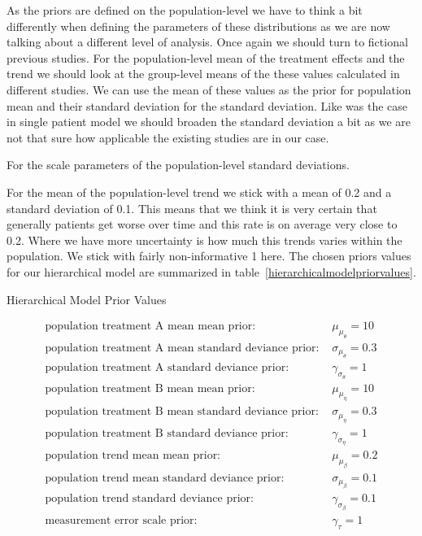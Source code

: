 \documentclass[12pt,a4paper,leqno]{report}
\theoremstyle{plain}
\theoremstyle{definition}
\theoremstyle{remark}
\begin{document}

As the priors are defined on the population-level we have to think a bit differently when defining the
parameters of these distributions as we are now talking about
a different level of analysis. Once again we should turn to fictional previous studies.
For the population-level mean of the treatment effects and the trend we should look at the
group-level means of the these values calculated in different studies. We can use the
mean of these values as the prior for population mean and their standard deviation for
the standard deviation. Like was the case in single patient model we should broaden the
standard deviation a bit as we are not that sure how applicable the existing studies are in our case.

For the scale parameters of the population-level standard deviations.


For the mean of the population-level trend we stick with a mean of 0.2 and a standard
deviation of 0.1. This means that we think it is very certain that generally patients
get worse over time and this rate is on average very close to 0.2. Where we have more
uncertainty is how much this trends varies within the population. We stick with fairly
non-informative 1 here. The chosen priors values for our hierarchical
model are summarized in table\ \ref{hierarchicalmodelpriorvalues}.

\begin{table}[H]
    \caption{Hierarchical Model Prior Values}\label{hierarchicalmodelpriorvalues}
    \begin{align}\label{}
        \text{population treatment A mean mean prior: } & \mu_{\mu_{\theta}} = 10 \nonumber \\
        \text{population treatment A mean standard deviance prior: } & \sigma_{\mu_{\theta}} = 0.3 \nonumber \\
        \text{population treatment A standard deviance prior: } & \gamma_{\sigma_{\theta}} = 1 \nonumber \\
        \text{population treatment B mean mean prior: } & \mu_{\mu_{\eta}} = 10 \nonumber \\
        \text{population treatment B mean standard deviance prior: } & \sigma_{\mu_{\eta}} = 0.3 \nonumber \\
        \text{population treatment B standard deviance prior: } & \gamma_{\sigma_{\eta}} = 1 \nonumber \\
        \text{population trend mean mean prior: } & \mu_{\mu_{\beta}} = 0.2 \nonumber \\
        \text{population trend mean standard deviance prior: } & \sigma_{\mu_{\beta}} = 0.1 \nonumber \\
        \text{population trend standard deviance prior: } & \gamma_{\sigma_{\beta}} = 0.1 \nonumber \\
        \text{measurement error scale prior: } & \gamma_{\tau} = 1 \nonumber
    \end{align}
\end{table}
\end{document}
